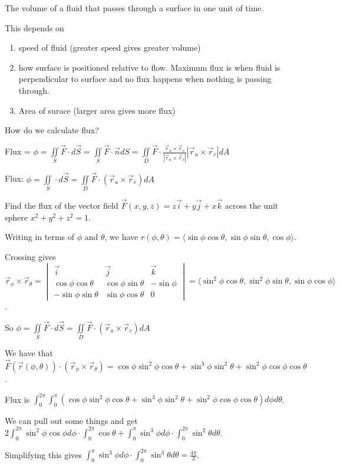 \documentclass[../calc3.tex]{subfiles}
\begin{document}
\pagebreak
\begin{definition}[Flux]
    The volume of a fluid that passes through a surface in one unit of time.

    This depends on 
    \begin{enumerate}
        \item speed of fluid (greater speed gives greater volume)
        \item how surface is positioned relative to flow. Maximum flux is when fluid is perpendicular to surface and no flux happens when nothing is passing through.
        \item Area of surace (larger area gives more flux)
    \end{enumerate}
\end{definition}

How do we calculate flux?

Flux = $\phi = \iint\limits_{S}\vec{F}\cdot d\vec{S} = \iint\limits_{S}\vec{F}\cdot \vec{n}dS = \iint\limits_{D}\vec{F}\cdot \frac{\vec{r}_u\times \vec{r}_v}{|\vec{r}_u\times \vec{r}_v|}|\vec{r}_u\times \vec{r}_v|dA$

Flux: $\phi = \iint\limits_{S}\cdot d\vec{S}=\iint\limits_{D}\vec{F}\cdot (\vec{r}_u\times \vec{r}_v)dA$

\begin{example}
    Find the flux of the vector field $\vec{F}(x,y,z)=z\vec{i}+y\vec{j}+x\vec{k}$ across the unit sphere $x^2+y^2+z^2=1$.

    Writing in terms of $\phi$ and $\theta$, we have $r(\phi,\theta)=\langle \sin\phi\cos\theta,\sin\phi\sin\theta,\cos\phi\rangle$.

    Crossing gives $\vec{r}_{\phi}\times \vec{r}_{\theta}=\begin{vmatrix}
        \vec{i}&\vec{j}&\vec{k}\\
        \cos\phi\cos\theta & \cos\phi\sin\theta & -\sin\phi \\
        -\sin\phi\sin\theta & \sin\phi\cos\theta & 0
    \end{vmatrix} = \langle \sin^2\phi\cos\theta,\sin^2\phi\sin\theta, \sin\phi\cos\phi\rangle$.

    So $\phi=\iint\limits_{S}\vec{F}\cdot d\vec{S}=\iint\limits_{D}\vec{F}\cdot (\vec{r}_u\times \vec{r}_v)dA$

    We have that $\vec{F}(\vec{r}(\phi,\theta))\cdot (\vec{r}_{\phi}\times \vec{r}_{\theta})=\cos\phi\sin^2\phi\cos\theta + \sin^3\phi\sin^2\theta + \sin^2\phi\cos\phi\cos\theta$.

    Flux is $\int_0^{2\pi}\int_0^{\pi}(\cos\phi\sin^2\phi\cos\theta + \sin^3\phi\sin^2\theta + \sin^2\phi\cos\phi\cos\theta)d\phi d\theta$.

    We can pull out some things and get $2\int_0^{2\pi}\sin^2\phi\cos\phi d\phi \cdot \int_0^{2\pi}\cos\theta + \int_0^{\pi}\sin^3\phi d\phi\cdot \int_0^{2\pi}\sin^2\theta d\theta$.

    Simplifying this gives $\int_0^{\pi}\sin^3\phi d\phi \cdot \int_0^{2\pi}\sin^3\theta d\theta = \frac{4\pi}{3}$.
\end{example}
\end{document}
